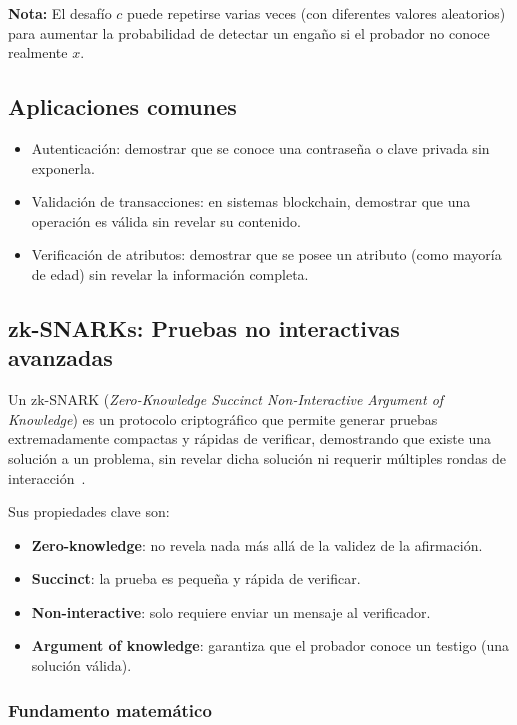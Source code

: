 \documentclass{article}
\begin{document}
\textbf{Nota:} El desafío \( c \) puede repetirse varias veces (con diferentes valores aleatorios) para aumentar la probabilidad de detectar un engaño si el probador no conoce realmente \( x \).

\subsection{Aplicaciones comunes}

\begin{itemize}
    \item Autenticación: demostrar que se conoce una contraseña o clave privada sin exponerla.
    \item Validación de transacciones: en sistemas blockchain, demostrar que una operación es válida sin revelar su contenido.
    \item Verificación de atributos: demostrar que se posee un atributo (como mayoría de edad) sin revelar la información completa.
\end{itemize}

\subsection{zk-SNARKs: Pruebas no interactivas avanzadas}

Un zk-SNARK (\textit{Zero-Knowledge Succinct Non-Interactive Argument of Knowledge}) es un protocolo criptográfico que permite generar pruebas extremadamente compactas y rápidas de verificar, demostrando que existe una solución a un problema, sin revelar dicha solución ni requerir múltiples rondas de interacción~\cite{ben2014}.

Sus propiedades clave son:
\begin{itemize}
    \item \textbf{Zero-knowledge}: no revela nada más allá de la validez de la afirmación.
    \item \textbf{Succinct}: la prueba es pequeña y rápida de verificar.
    \item \textbf{Non-interactive}: solo requiere enviar un mensaje al verificador.
    \item \textbf{Argument of knowledge}: garantiza que el probador conoce un testigo (una solución válida).
\end{itemize}

\subsubsection{Fundamento matemático}
\end{document}
